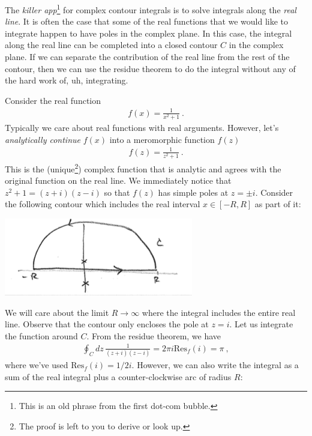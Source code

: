 The \emph{killer app}\footnote{This is an old phrase from the first dot-com bubble.} for complex contour integrals is to solve integrals along the \emph{real line}. It is often the case that some of the real functions that we would like to integrate happen to have poles in the complex plane. In this case, the integral along the real line can be completed into a closed contour $C$ in the complex plane. If we can separate the contribution of the real line from the rest of the contour, then we can use the residue theorem to do the integral without any of the hard work of, uh, integrating.

\begin{example}
Consider the real function
\begin{align}
	f(x) = \frac{1}{x^2 +1} \ .
\end{align}
Typically we care about real functions with real arguments. However, let's \emph{analytically continue} $f(x)$ into a meromorphic function $f(z)$
\begin{align}
	f(z) = \frac{1}{z^2+1} \ .
\end{align}
This is the (unique\footnote{The proof is left to you to derive or look up.}) complex function that is analytic and agrees with the original function on the real line. We immediately notice that $z^2+1 = (z+i)(z-i)$ so that $f(z)$ has simple poles at $z=\pm i$. Consider the following contour which includes the real interval $x\in [-R,R]$ as part of it:
\begin{center}
\includegraphics[width=.7\textwidth]{figures/Lec_2017_14_contour.png}
\end{center}
We will care about the limit $R\to \infty$ where the integral includes the entire real line.
Observe that the contour only encloses the pole at $z=i$. Let us integrate the function around $C$. From the residue theorem, we have
\begin{align}
	\oint_Cdz\, \frac{1}{(z+i)(z-i)} 
	= 2\pi i \text{Res}_f(i) 
	= \pi \ ,
\end{align}
where we've used $\text{Res}_f(i)=1/2i$. However, we can also write the integral as a sum of the real integral plus a counter-clockwise arc of radius $R$:

\end{example}
